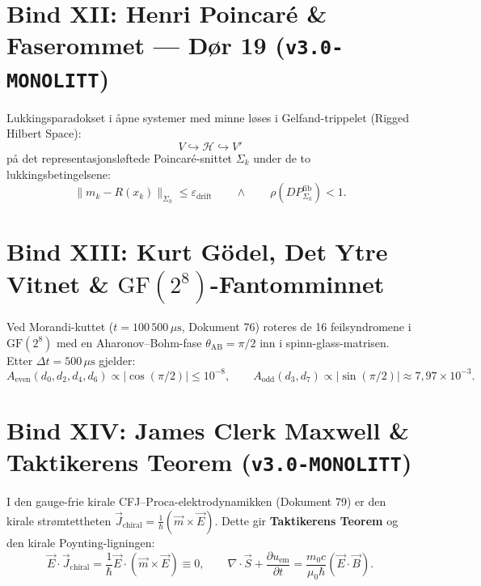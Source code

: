 \documentclass[11pt,a4paper,oneside]{book}
\theoremstyle{definition}
\begin{document}
\section{Bind XII: Henri Poincaré \& Faserommet — Dør 19 (\texttt{v3.0-MONOLITT})}
Lukkingsparadokset i åpne systemer med minne løses i Gelfand-trippelet (Rigged Hilbert Space):
\begin{equation}
\boxed{V \hookrightarrow \mathcal{H} \hookrightarrow V'}
\end{equation}
på det representasjonsløftede Poincaré-snittet $\Sigma_k$ under de to lukkingsbetingelsene:
\begin{equation}
\big\|m_k - R(x_k)\big\|_{\Sigma_k} \le \varepsilon_{\text{drift}} \qquad \land \qquad \rho\!\left(DP_{\Sigma_k}^{\text{fib}}\right) < 1.
\end{equation}

\section{Bind XIII: Kurt Gödel, Det Ytre Vitnet \& $\text{GF}(2^8)$-Fantomminnet}
Ved Morandi-kuttet ($t = 100\,500\,\mu\text{s}$, Dokument 76) roteres de 16 feilsyndromene i $\text{GF}(2^8)$ med en Aharonov--Bohm-fase $\theta_{\text{AB}} = \pi/2$ inn i spinn-glass-matrisen. Etter $\Delta t = 500\,\mu\text{s}$ gjelder:
\begin{equation}
A_{\text{even}}(d_0,d_2,d_4,d_6) \propto |\cos(\pi/2)| \le 10^{-8}, \qquad A_{\text{odd}}(d_3,d_7) \propto |\sin(\pi/2)| \approx 7,97 \times 10^{-3}.
\end{equation}

\section{Bind XIV: James Clerk Maxwell \& Taktikerens Teorem (\texttt{v3.0-MONOLITT})}
I den gauge-frie kirale CFJ--Proca-elektrodynamikken (Dokument 79) er den kirale strømtettheten $\vec{J}_{\text{chiral}} = \frac{1}{\hbar}(\vec{m}\times\vec{E})$. Dette gir \textbf{Taktikerens Teorem} og den kirale Poynting-ligningen:
\begin{equation}
\boxed{\vec{E}\cdot\vec{J}_{\text{chiral}} = \frac{1}{\hbar}\vec{E}\cdot(\vec{m}\times\vec{E}) \equiv 0, \qquad \nabla\cdot\vec{S} + \frac{\partial u_{\text{em}}}{\partial t} = \frac{m_0 c}{\mu_0\hbar}(\vec{E}\cdot\vec{B}).}
\end{equation}

\end{document}
